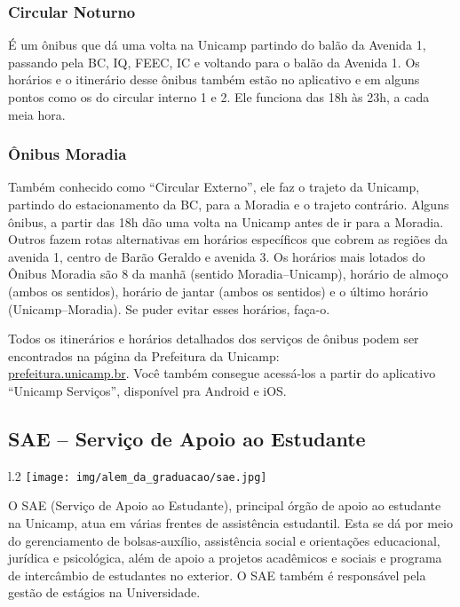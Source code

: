 \subsubsection{Circular Noturno}
É um ônibus que dá uma volta na Unicamp partindo do balão da Avenida 1,
passando pela BC, IQ, FEEC, IC e voltando para o balão da Avenida 1. Os
horários e o itinerário desse ônibus também estão no aplicativo e em alguns
pontos como os do circular interno 1 e 2. Ele funciona das 18h às 23h, a cada
meia hora.

\subsubsection{Ônibus Moradia}
Também conhecido como ``Circular Externo'', ele faz o trajeto da Unicamp,
partindo do estacionamento da BC, para a Moradia e o trajeto contrário. Alguns
ônibus, a partir das 18h dão uma volta na Unicamp antes de ir para a Moradia.
Outros fazem rotas alternativas em horários específicos que cobrem as regiões
da avenida 1, centro de Barão Geraldo e avenida 3. Os horários mais lotados do
Ônibus Moradia são 8 da manhã (sentido Moradia--Unicamp), horário de almoço
(ambos os sentidos), horário de jantar (ambos os sentidos) e o último horário
(Unicamp--Moradia). Se puder evitar esses horários, faça-o.

Todos os itinerários e horários detalhados dos serviços de ônibus podem ser
encontrados na página da Prefeitura da Unicamp: \\\url{prefeitura.unicamp.br}.
Você também consegue acessá-los a partir do aplicativo ``Unicamp Serviços'',
disponível pra Android e iOS.

\subsection{SAE -- Serviço de Apoio ao Estudante}

\begin{wrapfigure}{l}{.2\textwidth}
    \centering
    \texttt{[image: img/alem\_da\_graduacao/sae.jpg]}
\end{wrapfigure}

O SAE (Serviço de Apoio ao Estudante), principal órgão de apoio ao estudante na
Unicamp, atua em várias frentes de assistência estudantil. Esta se dá por meio
do gerenciamento de bolsas-auxílio, assistência social e orientações
educacional, jurídica e psicológica, além de apoio a projetos acadêmicos e
sociais e programa de intercâmbio de estudantes no exterior. O SAE também é
responsável pela gestão de estágios na Universidade.

